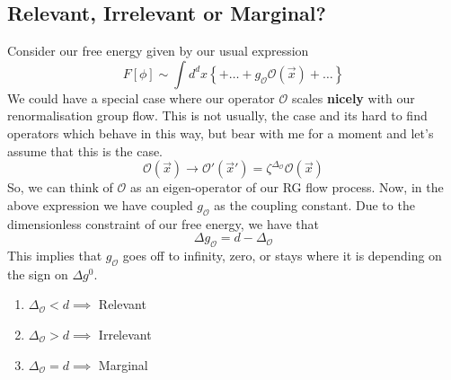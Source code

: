\subsection{Relevant, Irrelevant or Marginal?} 
Consider our free energy given by our usual expression 
\[
	F [ \phi ] \sim \int d^ d x \left\{  + \dots + g_{ \mathcal{ O } } \mathcal{ O } ( \vec{x} ) + \dots  \right\}  
\]  We could have a special case 
where our operator $ \mathcal{ O } $ scales \textbf{nicely}
with our renormalisation group flow. This is not usually, 
the case and its hard to find operators which behave in this way, 
but bear with me for a moment and let's assume that this is the case. 
\[
	\mathcal{ O } ( \vec{x} ) \to \mathcal{ O } ' ( \vec{x} ' ) = \zeta^{ \Delta_{ \mathcal{ O } } } \mathcal{ O } ( \vec{x} ) 
\] So, we can 
think of $\mathcal{ O } $ as an eigen-operator 
of our RG flow process. Now, in the above expression 
we have coupled $ g_{ \mathcal{ O } } $ as the coupling constant. 
Due to the dimensionless constraint of our free energy, 
we have that 
\[
 \Delta g_{ \mathcal{ O } } = d - \Delta _{ \mathcal{ O } }
\] This implies that $ g_{ \mathcal{ O } }$ goes 
off to infinity, zero, or stays where it is depending
on the sign on $ \Delta g ^{ \mathcal{ 0 }}$. 

\begin{enumerate}
	\item $ \Delta_{ \mathcal{ O } } < d \implies $ Relevant 
	\item $ \Delta_{ \mathcal{ O } } > d  \implies $ Irrelevant
	\item $ \Delta_{ \mathcal{ O } }  = d \implies $ Marginal 
\end{enumerate}


